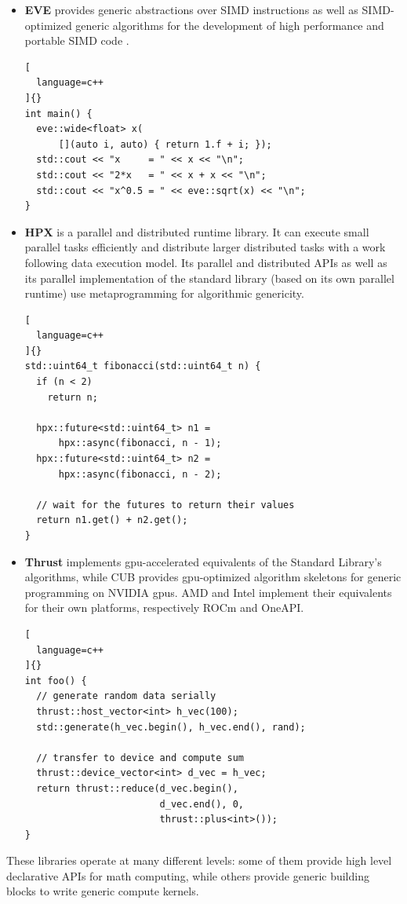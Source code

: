 \documentclass[../main]{subfiles}
\begin{document}
\begin{itemize}
\begin{lstlisting}[
  language=c++
]{}
  x = 40.0 * y + 2.0;

  NT2_DISPLAY(x);
}
\end{lstlisting}

  \item

\textbf{EVE} \cite{eve} provides generic abstractions over SIMD instructions
as well as SIMD-optimized generic algorithms for the development of
high performance and portable SIMD code \cite{hpcs2018-matvec}.

\begin{lstlisting}[
  language=c++
]{}
int main() {
  eve::wide<float> x(
      [](auto i, auto) { return 1.f + i; });
  std::cout << "x     = " << x << "\n";
  std::cout << "2*x   = " << x + x << "\n";
  std::cout << "x^0.5 = " << eve::sqrt(x) << "\n";
}
\end{lstlisting}

  \item

\textbf{HPX} \cite{hpx} is a \cpp parallel and distributed runtime library.
It can execute small parallel tasks efficiently and distribute
larger distributed tasks with a work following data execution model.
Its parallel and distributed APIs as well as its parallel implementation of
the standard library (based on its own parallel runtime) use metaprogramming
for algorithmic genericity.

\begin{lstlisting}[
  language=c++
]{}
std::uint64_t fibonacci(std::uint64_t n) {
  if (n < 2)
    return n;

  hpx::future<std::uint64_t> n1 =
      hpx::async(fibonacci, n - 1);
  hpx::future<std::uint64_t> n2 =
      hpx::async(fibonacci, n - 2);

  // wait for the futures to return their values
  return n1.get() + n2.get();
}
\end{lstlisting}

  \item

\textbf{Thrust} \cite{thrust} implements \gls{gpu}-accelerated equivalents
of the Standard Library's algorithms, while CUB \cite{cub} provides
\gls{gpu}-optimized algorithm skeletons for generic programming on NVIDIA
\glspl{gpu}.
AMD and Intel implement their equivalents for their own platforms, respectively
ROCm and OneAPI.

\begin{lstlisting}[
  language=c++
]{}
int foo() {
  // generate random data serially
  thrust::host_vector<int> h_vec(100);
  std::generate(h_vec.begin(), h_vec.end(), rand);

  // transfer to device and compute sum
  thrust::device_vector<int> d_vec = h_vec;
  return thrust::reduce(d_vec.begin(),
                        d_vec.end(), 0,
                        thrust::plus<int>());
}
\end{lstlisting}

\end{itemize}

These libraries operate at many different levels: some of them provide
high level declarative APIs for math computing, while others provide generic
building blocks to write generic compute kernels.
\end{document}
